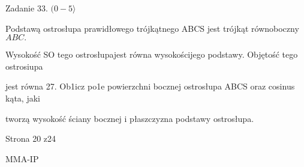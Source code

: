 \documentclass[a4paper,12pt]{article}
\begin{document}
Zadanie 33. $(0-5\rangle$

Podstawą ostrosłupa prawidłowego trójkątnego ABCS jest trójkąt równoboczny $ABC.$

Wysokość SO tego ostrosłupajest równa wysokościjego podstawy. Objętość tego ostrosiupa

jest równa 27. Ob1icz po1e powierzchni bocznej ostrosłupa ABCS oraz cosinus kąta, jaki

tworzą wysokość ściany bocznej i płaszczyzna podstawy ostrosłupa.

Strona 20 z24

MMA-IP
\end{document}

